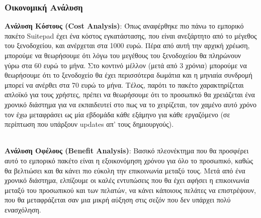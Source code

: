 \subsubsection{Οικονομική Ανάλυση}
\textbf{Ανάλυση Κόστους (Cost Analysis)}: Όπως αναφέρθηκε πιο πάνω το εμπορικό 
πακέτο Suitepad έχει ένα κόστος εγκατάστασης, που είναι ανεξάρτητο από το μέγεθος 
του ξενοδοχείου, και ανέρχεται στα 1000 ευρώ. Πέρα από αυτή την αρχική χρέωση, 
μπορούμε να θεωρήσουμε ότι λόγω του μεγέθους του ξενοδοχείου θα πληρώνουν γύρω 
στα 60 ευρώ το μήνα. Στο κοντινό μέλλον (μετά από 3 χρόνια) μπορούμε να θεωρήσουμε 
ότι το ξενοδοχείο θα έχει περισσότερα δωμάτια και η μηνιαία συνδρομή μπορεί να ανέρθει 
στα 70 ευρώ το μήνα. Τέλος, παρότι το πακέτο χαρακτηρίζεται απλοϊκό για τους χρήστες, 
πρέπει να θεωρήσουμε ότι το προσωπικό θα χρειάζεται ένα χρονικό διάστημα για να 
εκπαιδευτεί στο πως να το χειρίζεται, τον χαμένο αυτό χρόνο τον έχω μεταφράσει ως μία 
εβδομάδα κάθε εξάμηνο για κάθε εργαζόμενο (σε περίπτωση που υπάρξουν updates απ' 
τους δημιουργούς).

\begin{table}[H]
\end{table}

\noindent
\\ \textbf{Ανάλυση Οφέλους (Benefit Analysis)}: Βασικό πλεονέκτημα που θα προσφέρει 
αυτό το εμπορικό πακέτο είναι η εξοικονόμηση χρόνου για όλο το προσωπικό, καθώς 
θα βελτιώσει και θα κάνει πιο εύκολη την επικοινωνία μεταξύ τους. Μετά από ένα χρονικό 
διάστημα, ελπίζουμε οι καλές εντυπώσεις που θα έχει αφήσει η επικοινωνία μεταξύ του 
προσωπικού και των πελατών, να κάνει κάποιους πελάτες να επιστρέψουν, που θα 
μεταφράζεται σαν μια μικρή αύξηση στις σεζόν που δεν υπάρχει πολύ ενασχόληση.

\begin{table}[H]
	\centering
\end{table}

